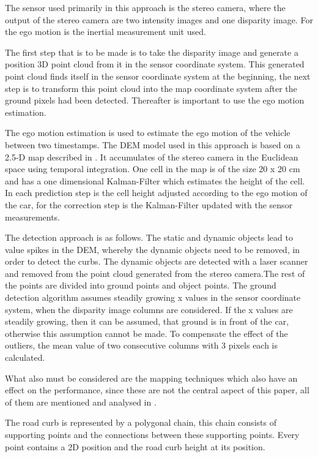 \documentclass[conference]{IEEEtran}
\begin{document}
The sensor used primarily in this approach is the stereo camera, where the output of the stereo camera are two intensity images and one disparity image. For the ego motion is the inertial measurement unit used. 

The first step that is to be made is to take the disparity image and generate a position 3D point cloud from it in the sensor coordinate system. This generated point cloud finds itself in the sensor coordinate system at the beginning, the next step is to transform this point cloud into the map coordinate system after the ground pixels had been detected. Thereafter is important to use the ego motion estimation. 

The ego motion estimation is used to estimate the ego motion of the vehicle between two timestamps. The DEM model used in this approach is based on a 2.5-D map described in \cite{bewegung}. It accumulates of the stereo camera in the Euclidean space using temporal integration. One cell in the map is of the size 20 x 20 cm and has a one dimensional Kalman-Filter which estimates the height of the cell. In each prediction step is the cell height adjusted according to the ego motion of the car, for the correction step is the Kalman-Filter updated with the sensor measurements. 

The detection approach is as follows. The static and dynamic objects lead to value spikes in the DEM, whereby the dynamic objects need to be removed, in order to detect the curbs. The dynamic objects are detected with a laser scanner and removed from the point cloud generated from the stereo camera.The rest of the points are divided into ground points and object points. The ground detection algorithm assumes steadily growing x values in the sensor coordinate system, when the disparity image columns are considered. If the x values are steadily growing, then it can be assumed, that ground is in front of the car, otherwise this assumption cannot be made. To compensate the effect of the outliers, the mean value of two consecutive columns with 3 pixels each is calculated.

What also must be considered are the mapping techniques which also have an effect on the performance, since these are not the central aspect of this paper, all of them are mentioned and analysed in \cite{stereo}. 

The road curb is represented by a polygonal chain, this chain consists of supporting points and the connections between these supporting points. Every point contains a 2D position and the road curb height at its position. 
\end{document}
